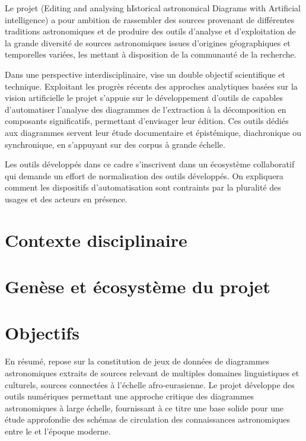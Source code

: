 Le projet \eida (Editing and analysing hIstorical astronomical Diagrams
with Artificial intelligence) a pour ambition de rassembler des sources
provenant de différentes traditions astronomiques et de produire des
outils d'analyse et d'exploitation de la grande diversité de sources
astronomiques issues d'origines géographiques et temporelles variées,
les mettant à disposition de la communauté de la recherche.

Dans une perspective interdisciplinaire, \eida vise un double objectif
scientifique et technique. Exploitant les progrès récents des approches
analytiques basées sur la vision artificielle le projet s'appuie sur le développement d'outils de
\dl capables d'automatiser l'analyse des diagrammes de
l'extraction à la décomposition en composants significatifs, permettant d'envisager leur édition. Ces outils dédiés aux diagrammes
servent leur étude documentaire et épistémique, diachronique ou
synchronique, en s'appuyant sur des corpus à grande échelle.

Les outils développés dans ce cadre s'inscrivent dans un écosystème
collaboratif qui demande un effort de normalisation des outils
développés. On expliquera comment les dispositifs d'automatisation sont
contraints par la pluralité des usages et des acteurs en présence.

            \hypertarget{contexte-disciplinaire}{%
            \section{Contexte disciplinaire}\label{contexte-disciplinaire}}
                
            
            \hypertarget{genese-ecosysteme}{%
            \section{Genèse et écosystème du projet}\label{genese-ecosysteme}}
                
            
            \hypertarget{objectifs}{%
            \section{Objectifs}\label{objectifs}}
                

\vspace{2cm}

En résumé, \eida repose sur la constitution de jeux de données de
diagrammes astronomiques extraits de sources relevant de multiples
domaines linguistiques et culturels, sources connectées à l'échelle
afro-eurasienne. Le projet développe des outils numériques permettant
une approche critique des diagrammes astronomiques à large échelle,
fournissant à ce titre une base solide pour une étude approfondie des
schémas de circulation des connaissances astronomiques entre le
\ma et l'époque moderne.

